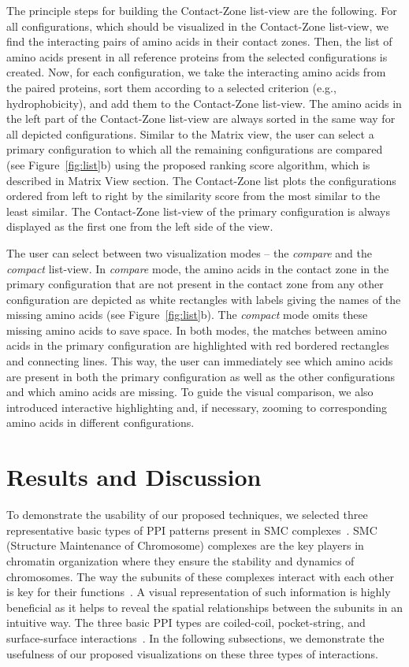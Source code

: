 \documentclass{bmcart}
\def\MatView {Matrix view\xspace}
\def\CoZoListView {Contact-Zone list-view\xspace}
\def\CoZoList{Contact-Zone list\xspace}
\begin{document}
The principle steps for building the \CoZoListView are the following.
For all configurations, which should be visualized in the \CoZoListView, we find the interacting pairs of amino acids in their contact zones.
Then, the list of amino acids present in all reference proteins from the selected configurations is created.
Now, for each configuration, we take the interacting amino acids from the paired proteins, sort them according to a selected criterion (e.g., hydrophobicity), and add them to the \CoZoListView.
The amino acids in the left part of the \CoZoListView are always sorted in the same way for all depicted configurations.
Similar to the \MatView, the user can select a primary configuration to which all the remaining configurations are compared (see Figure~\ref{fig:list}b) using the proposed ranking score algorithm, which is described in Matrix View section.
The \CoZoList plots the configurations ordered from left to right by the similarity score from the most similar to the least similar.
The \CoZoListView of the primary configuration is always displayed as the first one from the left side of the view.

The user can select between two visualization modes -- the \textit{compare} and the \textit{compact} list-view.
In \textit{compare} mode, the amino acids in the contact zone in the primary configuration that are not present in the contact zone from any other configuration are depicted as white rectangles with labels giving the names of the missing amino acids (see Figure~\ref{fig:list}b).
The \textit{compact} mode omits these missing amino acids to save space.
In both modes, the matches between amino acids in the primary configuration are highlighted with red bordered rectangles and connecting lines.
This way, the user can immediately see which amino acids are present in both the primary configuration as well as the other configurations and which amino acids are missing.
To guide the visual comparison, we also introduced interactive highlighting and, if necessary, zooming to corresponding amino acids in different configurations.

\section*{Results and Discussion}
To demonstrate the usability of our proposed techniques, we selected three representative basic types of PPI patterns present in SMC complexes~\cite{Palecek2015}. 
SMC (Structure Maintenance of Chromosome) complexes are the key players in chromatin organization where they ensure the stability and dynamics of chromosomes. The way the subunits of these complexes interact with each other is key for their functions~\cite{Gligoris}.
A visual representation of such information is highly beneficial as it helps to reveal the spatial relationships between the subunits in an intuitive way.
The three basic PPI types are coiled-coil, pocket-string, and surface-surface interactions~\cite{alberts02molecular}.
In the following subsections, we demonstrate the usefulness of our proposed visualizations on these three types of interactions.
\end{document}
